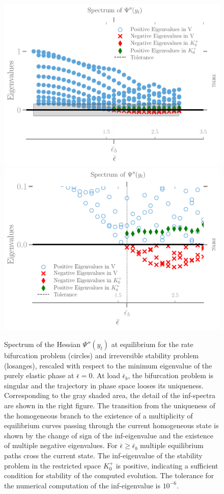

\begin{figure}[htbp]
    \centering
    \includegraphics*[width=.45\textwidth]{../images/spectra-7f4361886184f3c6791fe16bf4f4b3f2.pdf}
    \includegraphics*[width=.45\textwidth]{../images/spectra-zoom-7f4361886184f3c6791fe16bf4f4b3f2.pdf}
    \caption{Spectrum of the Hessian $\Psi''(y_t)$ at equilibrium for the rate bifurcation problem (circles) and irreversible stability problem (losanges), rescaled with respect to the minimum eigenvalue of the purely elastic phase at $\bar \epsilon = 0$. At load $\bar \epsilon_b$, the bifurcation problem is singular and the trajectory in phase space looses its uniqueness. 
    Corresponding to the gray shaded area, the detail of the inf-spectra are shown in the right figure. The transition from the uniqueness of the homogeneous branch to the existence of a multiplicity of equilibrium curves passing through the current homogeneous state is shown by the change of sign of the inf-eigenvalue and the existence of multiple negative eigenvalues. For $\bar \epsilon \geq \bar \epsilon_b$ multiple equilibrium paths cross the current state. The inf-eigenvalue of the stability problem in the restricted space $K^+_0$ is positive, indicating a sufficient condition for stability of the computed evolution. The tolerance for the numerical computation of the inf-eigenvalue is $10^{-6}$.}
    \label{fig:irreversibility}
\end{figure}


